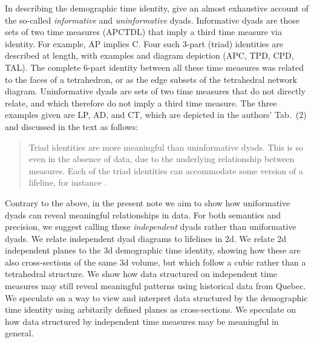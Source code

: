 In describing the demographic time identity, \citet{riffe2017demographictime} give an almost exhaustive account of the so-called \emph{informative} and \emph{uninformative} dyads. Informative dyads are those sets of two time measures (APCTDL) that imply a third time measure via identity. For example, AP implies C. Four such 3-part (triad) identities are described at length, with examples and diagram depiction (APC, TPD, CPD, TAL). The complete 6-part identity between all these time measures was related to the faces of a tetrahedron, or as the edge subsets of the tetrahedral network diagram. Uninformative dyads are sets of two time measures that do not directly relate, and which therefore do not imply a third time measure. The three examples given are LP, AD, and CT, which are depicted in the authors' Tab.~(2) and discussed in the text as follows:
\begin{quote}
Triad identities are more meaningful than uninformative dyads. This is so even in the absence of data, due to the underlying relationship between measures. Each of the triad identities can accommodate some version of a lifeline, for instance \citep[p5][]{riffe2017demographictime}. 
\end{quote}

Contrary to the above, in the present note we aim to show how uniformative dyads can reveal meaningful relationships in data. For both semantics and precision, we suggest calling these \emph{independent} dyads rather than uniformative dyads. We relate independent dyad diagrams to lifelines in 2d. We relate 2d independent planes to the 3d demographic time identity, showing how these are also cross-sections of the same 3d volume, but which follow a cubic rather than a tetrahedral structure. We show how data structured on independent time measures may still reveal meaningful patterns using historical data from Quebec. We speculate on a way to view and interpret data structured by the demographic time identity using arbitarily defined planes as cross-sections. We speculate on how data structured by independent time measures may be meaningful in general.


